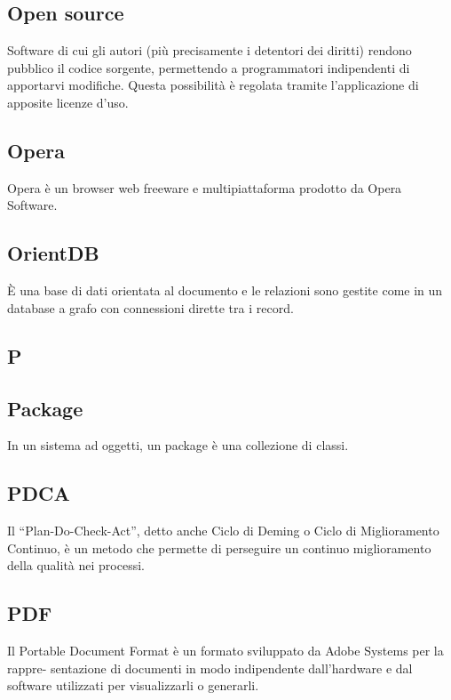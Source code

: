 \subsection{Open source}
Software di cui gli autori (più precisamente i detentori dei diritti) rendono pubblico
il codice sorgente, permettendo a programmatori indipendenti di apportarvi modifiche.
Questa possibilità è regolata tramite l'applicazione di apposite licenze d'uso.

\subsection{Opera}
Opera è un browser web freeware e multipiattaforma prodotto da Opera Software.

\subsection{OrientDB}
È una base di dati orientata al documento e le relazioni sono gestite come in un database a grafo con connessioni dirette tra i record.

\newpage

\begin{center}
\Huge\section{\uppercase{P}}
\end{center}

\subsection{Package}
In un sistema ad oggetti, un package è una collezione di classi.

\subsection{PDCA}
Il “Plan-Do-Check-Act”, detto anche Ciclo di Deming o Ciclo di Miglioramento Continuo,
è un metodo che permette di perseguire un continuo miglioramento della qualità nei processi.

\subsection{PDF}
Il Portable Document Format è un formato sviluppato da Adobe Systems per la rappre-
sentazione di documenti in modo indipendente dall’hardware e dal software utilizzati per
visualizzarli o generarli.

